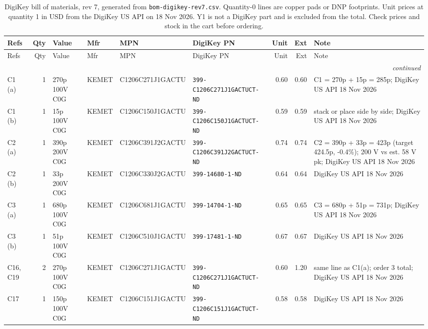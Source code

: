 \begin{longtable}{@{}p{1.8cm}r >{\raggedright\arraybackslash}p{2.3cm} >{\raggedright\arraybackslash}p{1.9cm} p{3.7cm} p{4.4cm} r r >{\raggedright\arraybackslash}p{3.9cm}@{}}
\caption{DigiKey bill of materials, rev 7, generated from \texttt{bom-digikey-rev7.csv}. Quantity-0 lines are copper pads or DNP footprints. Unit prices at quantity 1 in USD from the DigiKey US API on 18 Nov 2026. Y1 is not a DigiKey part and is excluded from the total. Check prices and stock in the cart before ordering.}\label{tab:bom}\\
\toprule Refs & Qty & Value & Mfr & MPN & DigiKey PN & Unit & Ext & Note\\ \midrule\endfirsthead
\toprule Refs & Qty & Value & Mfr & MPN & DigiKey PN & Unit & Ext & Note\\ \midrule\endhead
\midrule\multicolumn{9}{r}{\emph{continued}}\\\endfoot\bottomrule\endlastfoot
C1 (a) & 1 & 270p 100V C0G & KEMET & C1206C271J1GACTU & \texttt{\footnotesize 399-C1206C271J1GACTUCT-ND} & 0.60 & 0.60 & C1 = 270p + 15p = 285p; DigiKey US API 18 Nov 2026\\
C1 (b) & 1 & 15p 100V C0G & KEMET & C1206C150J1GACTU & \texttt{\footnotesize 399-C1206C150J1GACTUCT-ND} & 0.59 & 0.59 & stack or place side by side; DigiKey US API 18 Nov 2026\\
C2 (a) & 1 & 390p 200V C0G & KEMET & C1206C391J2GACTU & \texttt{\footnotesize 399-C1206C391J2GACTUCT-ND} & 0.74 & 0.74 & C2 = 390p + 33p = 423p (target 424.5p, -0.4\%); 200 V vs est. 58 V pk; DigiKey US API 18 Nov 2026\\
C2 (b) & 1 & 33p 200V C0G & KEMET & C1206C330J2GACTU & \texttt{\footnotesize 399-14680-1-ND} & 0.64 & 0.64 & DigiKey US API 18 Nov 2026\\
C3 (a) & 1 & 680p 100V C0G & KEMET & C1206C681J1GACTU & \texttt{\footnotesize 399-14704-1-ND} & 0.65 & 0.65 & C3 = 680p + 51p = 731p; DigiKey US API 18 Nov 2026\\
C3 (b) & 1 & 51p 100V C0G & KEMET & C1206C510J1GACTU & \texttt{\footnotesize 399-17481-1-ND} & 0.67 & 0.67 & DigiKey US API 18 Nov 2026\\
C16, C19 & 2 & 270p 100V C0G & KEMET & C1206C271J1GACTU & \texttt{\footnotesize 399-C1206C271J1GACTUCT-ND} & 0.60 & 1.20 & same line as C1(a); order 3 total; DigiKey US API 18 Nov 2026\\
C17 & 1 & 150p 100V C0G & KEMET & C1206C151J1GACTU & \texttt{\footnotesize 399-C1206C151J1GACTUCT-ND} & 0.58 & 0.58 & DigiKey US API 18 Nov 2026\\

\end{longtable}
